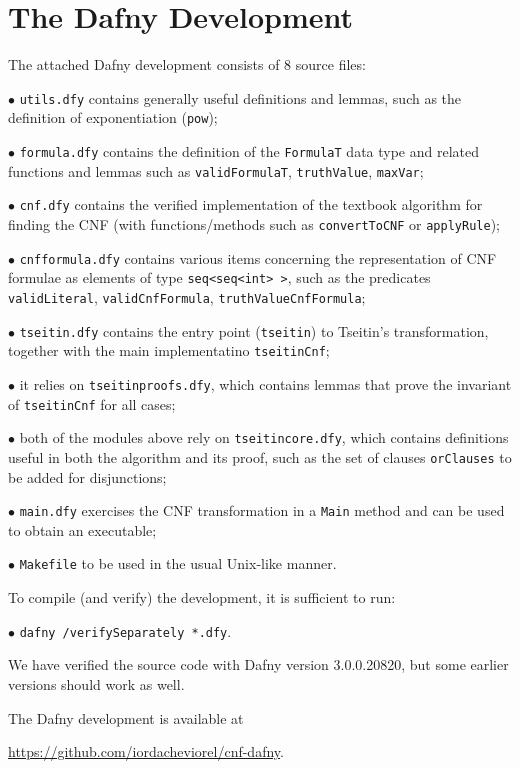 \documentclass[12pt]{report}
\begin{document}
\section{The Dafny Development}
\label{sec:development}

The attached Dafny development consists of 8 source files:


\( \bullet \) \texttt{utils.dfy} contains generally useful definitions and
  lemmas, such as the definition of exponentiation (\texttt{pow});

\( \bullet \) \texttt{formula.dfy} contains the definition of the
  \texttt{FormulaT} data type and related functions and lemmas such as
  \texttt{validFormulaT}, \texttt{truthValue}, \texttt{maxVar};

\( \bullet \) \texttt{cnf.dfy} contains the verified implementation of the
  textbook algorithm for finding the CNF (with functions/methods such
  as \texttt{convertToCNF} or \texttt{applyRule});
  
\( \bullet \) \texttt{cnfformula.dfy} contains various items concerning the
  representation of CNF formulae as elements of type
  \texttt{seq<seq<int> >}, such as the predicates
  \texttt{validLiteral}, \texttt{validCnfFormula},
  \texttt{truthValueCnfFormula};

\( \bullet \) \texttt{tseitin.dfy} contains the entry point (\texttt{tseitin})
  to Tseitin's transformation, together with the main implementatino
  \texttt{tseitinCnf};

\( \bullet \) it relies on \texttt{tseitinproofs.dfy}, which contains lemmas
  that prove the invariant of \texttt{tseitinCnf} for all cases;

\( \bullet \) both of the modules above rely on \texttt{tseitincore.dfy},
  which contains definitions useful in both the algorithm and its
  proof, such as the set of clauses \texttt{orClauses} to be added for
  disjunctions;

\( \bullet \) \texttt{main.dfy} exercises the CNF transformation in a
  \texttt{Main} method and can be used to obtain an executable;

\( \bullet \) \texttt{Makefile} to be used in the usual Unix-like manner.

To compile (and verify) the development, it is sufficient to run:

\( \bullet \) \texttt{dafny /verifySeparately *.dfy}.

We have verified the source code with Dafny version 3.0.0.20820, but
some earlier versions should work as well.

The Dafny development is available at
\begin{center}\url{https://github.com/iordacheviorel/cnf-dafny}.\end{center}
\end{document}
